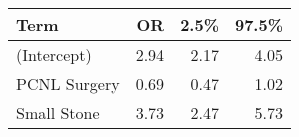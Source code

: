 \begin{table}[ht]
\centering
\begin{tabular}{lrrr}
  \toprule
{\textbf{Term}} & {\textbf{OR}} & {\textbf{2.5\%}} & {\textbf{97.5\%}} \\ 
  \midrule
(Intercept) & 2.94 & 2.17 & 4.05 \\ 
  PCNL Surgery & 0.69 & 0.47 & 1.02 \\ 
  Small Stone & 3.73 & 2.47 & 5.73 \\ 
   \bottomrule
\end{tabular}
\end{table}
